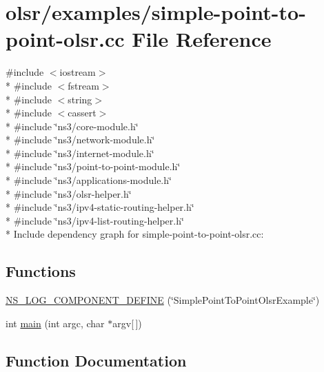 \hypertarget{simple-point-to-point-olsr_8cc}{}\section{olsr/examples/simple-\/point-\/to-\/point-\/olsr.cc File Reference}
\label{simple-point-to-point-olsr_8cc}
{\ttfamily \#include $<$iostream$>$}\\*
{\ttfamily \#include $<$fstream$>$}\\*
{\ttfamily \#include $<$string$>$}\\*
{\ttfamily \#include $<$cassert$>$}\\*
{\ttfamily \#include \char`\"{}ns3/core-\/module.\+h\char`\"{}}\\*
{\ttfamily \#include \char`\"{}ns3/network-\/module.\+h\char`\"{}}\\*
{\ttfamily \#include \char`\"{}ns3/internet-\/module.\+h\char`\"{}}\\*
{\ttfamily \#include \char`\"{}ns3/point-\/to-\/point-\/module.\+h\char`\"{}}\\*
{\ttfamily \#include \char`\"{}ns3/applications-\/module.\+h\char`\"{}}\\*
{\ttfamily \#include \char`\"{}ns3/olsr-\/helper.\+h\char`\"{}}\\*
{\ttfamily \#include \char`\"{}ns3/ipv4-\/static-\/routing-\/helper.\+h\char`\"{}}\\*
{\ttfamily \#include \char`\"{}ns3/ipv4-\/list-\/routing-\/helper.\+h\char`\"{}}\\*
Include dependency graph for simple-\/point-\/to-\/point-\/olsr.cc\+:
\subsection*{Functions}
\begin{DoxyCompactItemize}
\item 
\hyperlink{simple-point-to-point-olsr_8cc_a00da915f2fe1d150885a10f3640f96cb}{N\+S\+\_\+\+L\+O\+G\+\_\+\+C\+O\+M\+P\+O\+N\+E\+N\+T\+\_\+\+D\+E\+F\+I\+NE} (\char`\"{}Simple\+Point\+To\+Point\+Olsr\+Example\char`\"{})
\item 
int \hyperlink{simple-point-to-point-olsr_8cc_a0ddf1224851353fc92bfbff6f499fa97}{main} (int argc, char $\ast$argv\mbox{[}$\,$\mbox{]})
\end{DoxyCompactItemize}


\subsection{Function Documentation}
